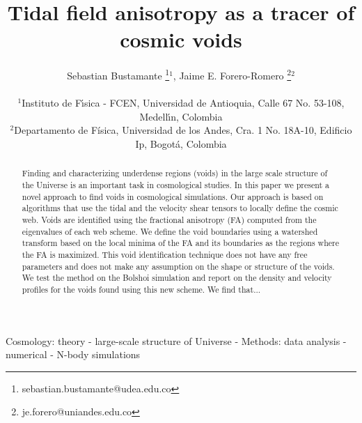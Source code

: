 \documentclass[a4,useAMS,usenatbib,usegraphicx]{latex/mn2e}
\begin{document}
\title{Tidal field anisotropy as a tracer of cosmic voids}
\author[S. Bustamante and J.E. Forero-Romero]{
\parbox[t]{\textwidth}{\raggedright 
  Sebastian Bustamante \thanks{sebastian.bustamante@udea.edu.co}$^{1}$,
  Jaime E. Forero-Romero \thanks{je.forero@uniandes.edu.co}$^{2}$ 
}
\vspace*{6pt}\\
$^1$Instituto de F\'{\i}sica - FCEN, Universidad de Antioquia, Calle
67 No. 53-108, Medell\'{\i}n, Colombia\\ 
$^2$Departamento de F\'{i}sica, Universidad de los Andes, Cra. 1
No. 18A-10, Edificio Ip, Bogot\'a, Colombia
}

\maketitle

\begin{abstract}
Finding and characterizing underdense regions (voids) in the large
scale structure of the Universe is an important task in cosmological
studies.  
In this paper we present a novel approach to find voids in
cosmological simulations.  
Our approach is based on algorithms that use the tidal and the
velocity shear tensors to locally define the cosmic web.
Voids are identified using the fractional anisotropy (FA) computed
from the eigenvalues of each web scheme. 
We define the void boundaries using a watershed transform based on the
local minima of the FA and its boundaries as the regions where the FA
is maximized.
This void identification technique does not have any free parameters
and does not make any assumption on the shape or structure of the
voids.  
We test the method on the Bolshoi simulation and report on the density
and velocity profiles for the voids found using this new scheme. 
We find that...
\end{abstract}

\begin{keywords}
Cosmology: theory - large-scale structure of Universe -
Methods: data analysis - numerical - N-body simulations
\end{keywords}


\end{document}
